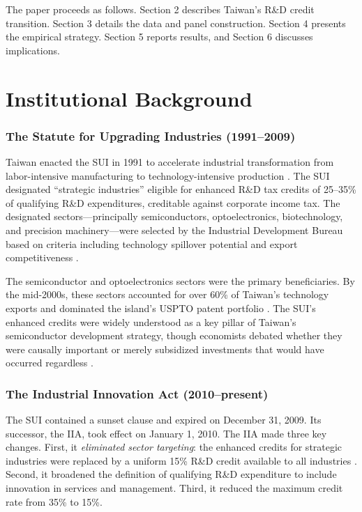 \documentclass[12pt]{article}
\begin{document}
The paper proceeds as follows. Section 2 describes Taiwan's R\&D credit transition. Section 3 details the data and panel construction. Section 4 presents the empirical strategy. Section 5 reports results, and Section 6 discusses implications.


\section{Institutional Background}

\subsubsection*{The Statute for Upgrading Industries (1991--2009)} Taiwan enacted the SUI in 1991 to accelerate industrial transformation from labor-intensive manufacturing to technology-intensive production \citep{chen2006taiwan}. The SUI designated ``strategic industries'' eligible for enhanced R\&D tax credits of 25--35\% of qualifying R\&D expenditures, creditable against corporate income tax. The designated sectors---principally semiconductors, optoelectronics, biotechnology, and precision machinery---were selected by the Industrial Development Bureau based on criteria including technology spillover potential and export competitiveness \citep{moeaidb2008}.

The semiconductor and optoelectronics sectors were the primary beneficiaries. By the mid-2000s, these sectors accounted for over 60\% of Taiwan's technology exports and dominated the island's USPTO patent portfolio \citep{unctad2005}. The SUI's enhanced credits were widely understood as a key pillar of Taiwan's semiconductor development strategy, though economists debated whether they were causally important or merely subsidized investments that would have occurred regardless \citep{hu2005returns, mathews2006dragon}.

\subsubsection*{The Industrial Innovation Act (2010--present)} The SUI contained a sunset clause and expired on December 31, 2009. Its successor, the IIA, took effect on January 1, 2010. The IIA made three key changes. First, it \textit{eliminated sector targeting}: the enhanced credits for strategic industries were replaced by a uniform 15\% R\&D credit available to all industries \citep{moea2010iia}. Second, it broadened the definition of qualifying R\&D expenditure to include innovation in services and management. Third, it reduced the maximum credit rate from 35\% to 15\%.
\end{document}
